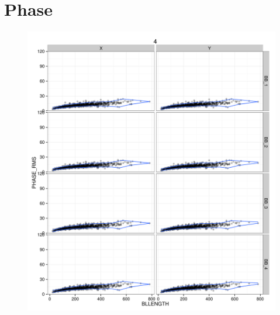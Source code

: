 \documentclass[10pt,]{article}
\begin{document}
\pagebreak

\section{Phase}\label{phase}

\begin{figure}[htbp]
\centering
\includegraphics{QA0rep_files/figure-latex/unnamed-chunk-12-1.pdf}
\caption{}
\end{figure}
\end{document}
